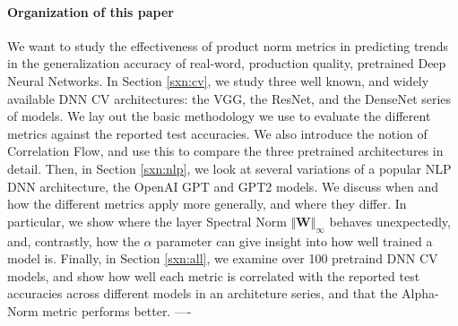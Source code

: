 \paragraph{Organization of this paper}
We want to study the effectiveness of product norm metrics in predicting trends in the
generalization accuracy of real-word, production quality, pretrained Deep Neural Networks.
In Section \ref{sxn:cv}, we study three well known, and widely available DNN CV architectures:
the VGG, the ResNet, and the DenseNet series of models.  We lay out the
basic methodology we use to evaluate the different metrics against the reported test accuracies. 
We also introduce the notion of Correlation Flow, and use this to 
compare the three pretrained architectures in detail.  
Then, in Section  \ref{sxn:nlp}, we look at several variations of a popular NLP DNN architecture,
the OpenAI GPT and GPT2 models.  We discuss when and how the different metrics apply more generally,
and where they differ.  In particular, we show where the layer Spectral Norm
 $\Vert\mathbf{W}\Vert_{\infty}$ behaves unexpectedly, and, contrastly, how
the $\alpha$ parameter can give insight into how well trained a model is.
Finally, in Section \ref{sxn:all}, we examine over 100 pretraind DNN CV models, and show
how well each metric is correlated with the reported test accuracies across different models
in an architeture series, and that the Alpha-Norm metric performs better.
----








